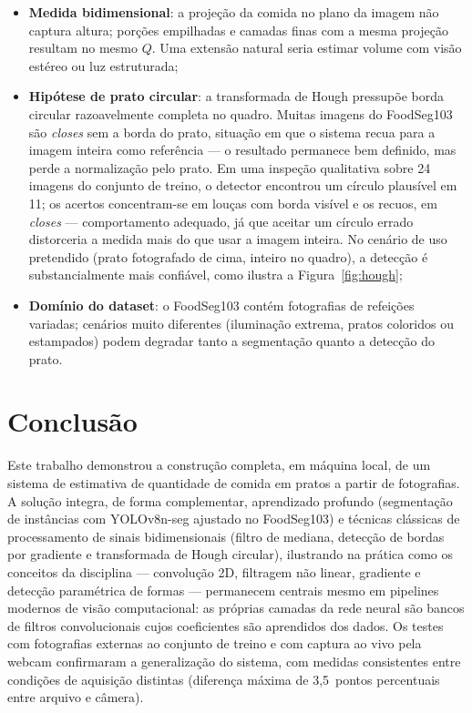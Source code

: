 \documentclass[12pt,a4paper]{article}
\begin{document}
\begin{itemize}
  \item \textbf{Medida bidimensional}: a projeção da comida no plano da imagem não captura
        altura; porções empilhadas e camadas finas com a mesma projeção resultam no mesmo
        $Q$. Uma extensão natural seria estimar volume com visão estéreo ou luz estruturada;
  \item \textbf{Hipótese de prato circular}: a transformada de Hough pressupõe borda circular
        razoavelmente completa no quadro. Muitas imagens do FoodSeg103 são \emph{closes} sem a
        borda do prato, situação em que o sistema recua para a imagem inteira como referência
        --- o resultado permanece bem definido, mas perde a normalização pelo prato. Em uma
        inspeção qualitativa sobre 24 imagens do conjunto de treino, o detector encontrou um
        círculo plausível em 11; os acertos concentram-se em louças com borda visível e os
        recuos, em \emph{closes} --- comportamento adequado, já que aceitar um círculo errado
        distorceria a medida mais do que usar a imagem inteira. No cenário de uso pretendido
        (prato fotografado de cima, inteiro no quadro), a detecção é substancialmente mais
        confiável, como ilustra a Figura~\ref{fig:hough};
  \item \textbf{Domínio do dataset}: o FoodSeg103 contém fotografias de refeições variadas;
        cenários muito diferentes (iluminação extrema, pratos coloridos ou estampados) podem
        degradar tanto a segmentação quanto a detecção do prato.
\end{itemize}

\section{Conclusão}

Este trabalho demonstrou a construção completa, em máquina local, de um sistema de estimativa
de quantidade de comida em pratos a partir de fotografias. A solução integra, de forma
complementar, aprendizado profundo (segmentação de instâncias com YOLOv8n-seg ajustado no
FoodSeg103) e técnicas clássicas de processamento de sinais bidimensionais (filtro de mediana,
detecção de bordas por gradiente e transformada de Hough circular), ilustrando na prática como
os conceitos da disciplina --- convolução 2D, filtragem não linear, gradiente e detecção
paramétrica de formas --- permanecem centrais mesmo em pipelines modernos de visão
computacional: as próprias camadas da rede neural são bancos de filtros convolucionais cujos
coeficientes são aprendidos dos dados. Os testes com fotografias externas ao conjunto de
treino e com captura ao vivo pela webcam confirmaram a generalização do sistema, com medidas
consistentes entre condições de aquisição distintas (diferença máxima de 3,5~pontos
percentuais entre arquivo e câmera).
\end{document}
